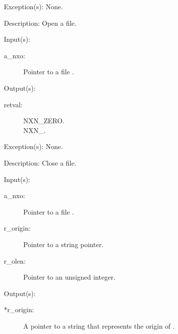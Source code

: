 \begin{capi}
\begin{capilist}
	\item[Exception(s): ] None.
	\item[Description: ]
		Open a file.
	\end{capilist}
\label{nxo_file_close}
	\begin{capilist}
	\item[Input(s): ]
		\begin{description}\item[]
		\item[a\_nxo: ]
			Pointer to a file .
		\end{description}
	\item[Output(s): ]
		\begin{description}\item[]
		\item[retval: ]
			\begin{description}\item[]
			\item[NXN\_ZERO.]
			\item[NXN\_.]
			\end{description}
		\end{description}
	\item[Exception(s): ] None.
	\item[Description: ]
		Close a file.
	\end{capilist}
\label{nxo_file_origin_get}
	\begin{capilist}
	\item[Input(s): ]
		\begin{description}\item[]
		\item[a\_nxo: ]
			Pointer to a file \classname{nxo}.
		\item[r\_origin: ] Pointer to a string pointer.
		\item[r\_olen: ] Pointer to an unsigned integer.
		\end{description}
	\item[Output(s): ]
		\begin{description}\item[]
		\item[*r\_origin: ]
			A pointer to a string that represents the origin of
			\cvar{a\_nxo}.

\end{description}
\end{capilist}
\end{capi}
